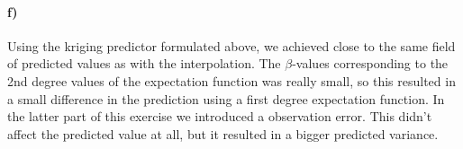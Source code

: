 \paragraph{f)}
Using the kriging predictor formulated above, we achieved close to the same field of predicted values as with the interpolation. The $\beta$-values corresponding to the 2nd degree values of the expectation function was really small, so this resulted in a small difference in the prediction using a first degree expectation function. In the latter part of this exercise we introduced a observation error. This didn't affect the predicted value at all, but it resulted in a bigger predicted variance. 